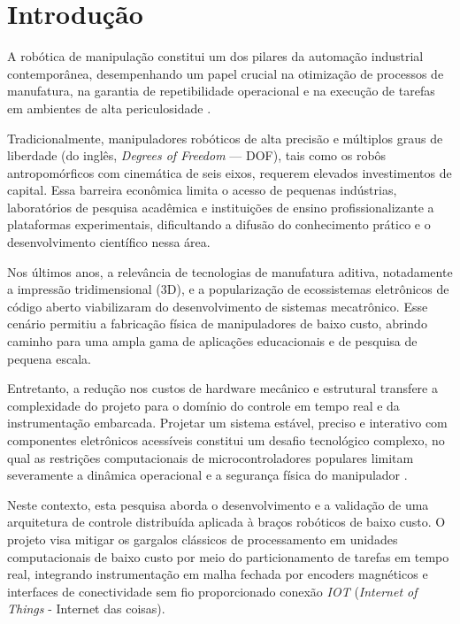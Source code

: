 \chapter{Introdução}
\label{cap:introducao}

A robótica de manipulação constitui um dos pilares da automação industrial contemporânea, desempenhando um papel crucial na otimização de processos de manufatura, na garantia de repetibilidade operacional e na execução de tarefas em ambientes de alta periculosidade \cite{siciliano2009robotics}.

Tradicionalmente, manipuladores robóticos de alta precisão e múltiplos graus de liberdade (do inglês, \textit{Degrees of Freedom} --- DOF), tais como os robôs antropomórficos com cinemática de seis eixos, requerem elevados investimentos de capital. Essa barreira econômica limita o acesso de pequenas indústrias, laboratórios de pesquisa acadêmica e instituições de ensino profissionalizante a plataformas experimentais, dificultando a difusão do conhecimento prático e o desenvolvimento científico nessa área.

Nos últimos anos, a relevância de tecnologias de manufatura aditiva, notadamente a impressão tridimensional (3D), e a popularização de ecossistemas eletrônicos de código aberto viabilizaram do desenvolvimento de sistemas mecatrônico. Esse cenário permitiu a fabricação física de manipuladores de baixo custo, abrindo caminho para uma ampla gama de aplicações educacionais e de pesquisa de pequena escala.

Entretanto, a redução nos custos de hardware mecânico e estrutural transfere a complexidade do projeto para o domínio do controle em tempo real e da instrumentação embarcada. Projetar um sistema estável, preciso e interativo com componentes eletrônicos acessíveis constitui um desafio tecnológico complexo, no qual as restrições computacionais de microcontroladores populares limitam severamente a dinâmica operacional e a segurança física do manipulador \cite{marton2009distributed}.

Neste contexto, esta pesquisa aborda o desenvolvimento e a validação de uma arquitetura de controle distribuída aplicada à braços robóticos de baixo custo. O projeto visa mitigar os gargalos clássicos de processamento em unidades computacionais de baixo custo por meio do particionamento de tarefas em tempo real, integrando instrumentação em malha fechada por encoders magnéticos e interfaces de conectividade sem fio proporcionado conexão \textit{IOT} (\textit{Internet of Things} - Internet das coisas).

